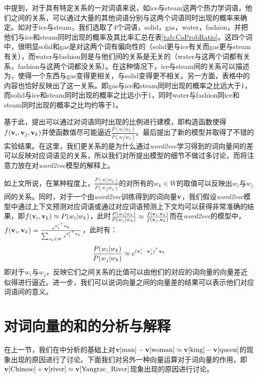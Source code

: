 \cite{pennington2014glove}中提到，对于具有特定关系的一对词语来说，如ice与steam这两个热力学词语，他们之间的关系，可以通过大量的其他词语分别与这两个词语同时出现的概率来确定。如对于ice与steam，我们选取了4个词语，solid，gas，water，fashion，并把他们与ice和steam同时出现的概率及其比率汇总在表\ref{tab:CoProbRatio}。这四个词中，很明显solid和gas是对这两个词有偏向性的（solid更与ice有关而gas更与steam有关），而water与fashion则是与他们间的关系是无关的（water与这两个词都有关系，fashion与这两个词都没关系）。在这种情况下，ice与steam间的关系可以描述为，使得一个东西与gas变得更相关，与solid变得更不相关。另一方面，表格中的内容也恰好反映出了这一关系。即gas与ice和steam同时出现的概率之比远大于1，而solid与ice和steam同时出现的概率之比远小于1，同时water与fashion同ice和steam同时出现的概率之比均约等于1。

基于此，\cite{pennington2014glove}提出可以通过对词语同时出现的比例进行建模，即构造函数使得$f({{\mathbf v}}_i, {{\mathbf v}}_j, {{\mathbf v}}_k)$并使函数值尽可能逼近$\frac{P(w_i|w_k)}{P(w_j|w_k)}$。最后提出了新的模型并取得了不错的实验结果。在这里，我们更关系的是为什么通过\emph{word2vec}学习得到的词向量间的差可以反映对应词语见的关系，所以我们对\citep{pennington2014glove}所提出模型的细节不做过多讨论，而将注意力放在对\emph{word2vec}模型的解释上。

如上文所说，在某种程度上，$\frac{P(w_i|w_k)}{P(w_j|w_k)}$的对所有的$w_k \in W$的取值可以反映出$w_i$与$w_j$间的关系。同时，对于一个由\emph{word2vec}训练得到的词向量${{\mathbf v}}$，我们假设\emph{word2vec}模型中通过上下文预测对应词语或通过对应词语预测上下文均可以获得非常准确的结果，即$f({{\mathbf v}}_i, {{\mathbf v}}_k) \approx P(w_i|w_k)$，此时$\frac{P(w_i|w_k)}{P(w_j|w_k)}\approx \frac{f({{\mathbf v}}_i, {{\mathbf v}}_k)}{f({{\mathbf v}}_j, {{\mathbf v}}_k)}$而在\emph{word2vec}的模型中，$f({{\mathbf v}}_i, {{\mathbf v}}_k) = \frac{e^{{{{\mathbf v}}'_i}^\top{{\mathbf v}}_k}}{\sum_{w_l \in W}e^{{{{\mathbf v}}'_l}^\top{{\mathbf v}}_k}}$，此时有：
\begin{equation*}
\frac{P(w_i|w_k)}{P(w_j|w_k)}\approx e^{({{{\mathbf v}}'_i-{{\mathbf v}}'_j)}^\top{{\mathbf v}}_k}
\end{equation*}
即对于$w_i$与$w_j$，反映它们之间关系的比值可以由他们的对应的词向量的向量差近似得进行逼近。进一步，我们可以说词向量之间的向量差的结果可以表示他们对应词语间的意义。

\section{对词向量的和的分析与解释}

在上一节，我们在\citep{pennington2014glove}中分析的基础上对${{\mathbf v}}[\mbox{man}]-{{\mathbf v}}[\mbox{woman}] \approx {{\mathbf v}}[\mbox{king}] - {{\mathbf v}}[\mbox{queen}]$的现象出现的原因进行了讨论。下面我们对另外一种向量运算对于词向量的作用，即${{\mathbf v}}[\mbox{Chinese}] + {{\mathbf v}}[\mbox{river}] \approx {{\mathbf v}}[\mbox{Yangtze\_River}]$现象出现的原因进行讨论。

